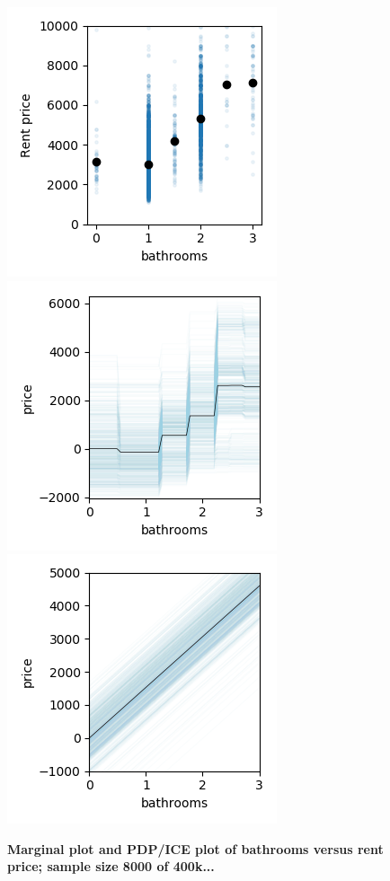 \documentclass[12pt]{article}
\begin{document}
\begin{figure}[htbp]
\begin{center}
\includegraphics[scale=0.7]{images/baths_vs_price.png}
\includegraphics[scale=0.7]{images/baths_vs_price_pdp.png}
\includegraphics[scale=0.7]{images/baths_vs_price_pdp_lm.png}
\caption{{\bf  Marginal plot and PDP/ICE plot of bathrooms versus rent price; sample size 8000 of 400k...}}
\label{fig:baths_price}
\end{center}
\end{figure}
\end{document}
